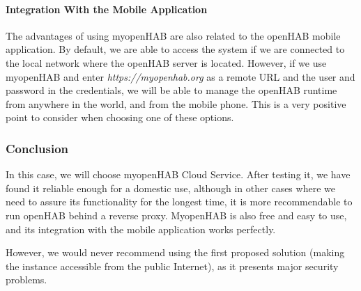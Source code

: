 \paragraph{Integration With the Mobile Application} The advantages of using myopenHAB are also related to the openHAB mobile application.
By default, we are able to access the system if we are connected to the local network where the openHAB server is located. However,
if we use myopenHAB and enter \textit{https://myopenhab.org} as a remote URL and the user and password in the credentials, we will
be able to manage the openHAB runtime from anywhere in the world, and from the mobile phone. This is a very positive point to
consider when choosing one of these options.

\subsubsection{Conclusion}
In this case, we will choose myopenHAB Cloud Service. After testing it, we have found it reliable enough for a domestic use, although
in other cases where we need to assure its functionality for the longest time, it is more recommendable to run openHAB behind a
reverse proxy. MyopenHAB is also free and easy to use, and its integration with the mobile application works perfectly.

However, we would never recommend using the first proposed solution (making the instance accessible from the public Internet), as
it presents major security problems.
